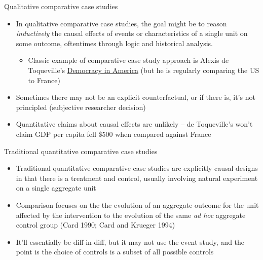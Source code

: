 \documentclass{beamer}
\begin{document}
\begin{frame}{Qualitative comparative case studies}
	
	\begin{itemize}
	\item In qualitative comparative case studies, the goal might be to reason \emph{inductively} the causal effects of events or characteristics of a single unit on some outcome, oftentimes through logic and historical analysis.  
		\begin{itemize}
		\item Classic example of comparative case study approach is Alexis de Toqueville's \underline{Democracy in America} (but he is regularly comparing the US to France)
		\end{itemize}
	\item Sometimes there may not be an explicit counterfactual, or if there is, it's not principled (subjective researcher decision)
	\item Quantitative claims about causal effects are unlikely -- de Toqueville's won't claim GDP per capita fell \$500 when compared against France
	\end{itemize}
\end{frame}

\begin{frame}{Traditional quantitative comparative case studies}

\begin{itemize}
	\item Traditional quantitative comparative case studies are explicitly causal designs in that there is a treatment and control, usually involving natural experiment on a single aggregate unit
	\item Comparison focuses on the the evolution of an aggregate outcome for the unit affected by the intervention to the evolution of the same \emph{ad hoc} aggregate control group (Card 1990; Card and Krueger 1994)
	\item It'll essentially be diff-in-diff, but it may not use the event study, and the point is the choice of controls is a subset of all possible controls
\end{itemize}

\end{frame}
\end{document}
